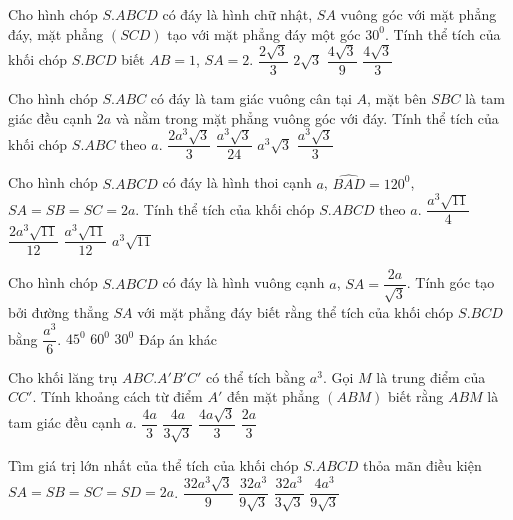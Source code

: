 \begin{ex}%
	Cho hình chóp $S.ABCD$ có đáy là hình chữ nhật, $SA$ vuông góc với mặt phẳng đáy, mặt phẳng $(SCD)$ tạo với mặt phẳng đáy một góc $30^0$. Tính thể tích của khối chóp $S.BCD$ biết $AB=1$, $SA=2$.
	\choice
	{\True $\dfrac{2\sqrt{3}}{3}$}
	{$2\sqrt{3}$}
	{$\dfrac{4\sqrt{3}}{9}$}
	{$\dfrac{4\sqrt{3}}{3}$}
\end{ex}

\begin{ex}%
	Cho hình chóp $S.ABC$ có đáy là tam giác vuông cân tại $A$, mặt bên $SBC$ là tam giác đều cạnh $2a$ và nằm trong mặt phẳng vuông góc với đáy.  Tính thể tích của khối chóp $S.ABC$ theo $a$.
	\choice
	{$\dfrac{2a^3\sqrt{3}}{3}$}
	{$\dfrac{a^3\sqrt{3}}{24}$}
	{$a^3\sqrt{3}$}
	{\True $\dfrac{a^3\sqrt{3}}{3}$}
\end{ex}

\begin{ex}%
	Cho hình chóp $S.ABCD$ có đáy là hình thoi cạnh $a$, $\widehat{BAD}=120^0$, $SA=SB=SC=2a$. Tính thể tích của khối chóp $S.ABCD$ theo $a$.
	\choice
	{$\dfrac{a^3\sqrt{11}}{4}$}
	{\True $\dfrac{2a^3\sqrt{11}}{12}$}
	{$\dfrac{a^3\sqrt{11}}{12}$}
	{$a^3\sqrt{11}$}
\end{ex}

\begin{ex}%
	Cho hình chóp $S.ABCD$ có đáy là hình vuông cạnh $a$, $SA=\dfrac{2a}{\sqrt{3}}$. Tính góc tạo bởi đường thẳng $SA$ với mặt phẳng đáy biết rằng thể tích của khối chóp $S.BCD$ bằng $\dfrac{a^3}{6}$.
	\choice
	{$45^0$}
	{\True $60^0$}
	{$30^0$}
	{Đáp án khác}
\end{ex}


\begin{ex}%
	Cho khối lăng trụ $ABC.A'B'C'$ có thể tích bằng $a^3$. Gọi $M$ là trung điểm của $CC'$. Tính khoảng cách từ điểm $A'$ đến mặt phẳng $(ABM)$ biết rằng  $ABM$ là tam giác đều cạnh $a$.
	\choice
	{$\dfrac{4a}{3}$}
	{$\dfrac{4a}{3\sqrt{3}}$}
	{\True $\dfrac{4a\sqrt{3}}{3}$}
	{$\dfrac{2a}{3}$}
\end{ex}

\begin{ex}%
	
	Tìm giá trị lớn nhất của thể tích của khối chóp $S.ABCD$  thỏa mãn điều kiện $SA=SB=SC=SD=2a$. 
	\choice
	{$\dfrac{32a^3\sqrt{3}}{9}$}
	{\True $\dfrac{32a^3}{9\sqrt{3}}$}
	{$\dfrac{32a^3}{3\sqrt{3}}$}
	{$\dfrac{4a^3}{9\sqrt{3}}$}
\end{ex}


